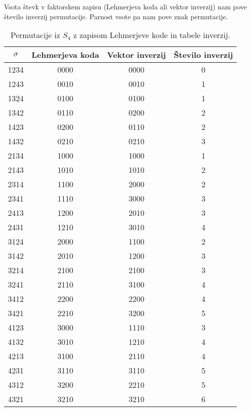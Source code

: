 \documentclass[a4paper, 12pt]{book}
\begin{document}
Vsota števk v faktorskem zapisu (Lehmerjeva koda ali vektor inverzij) nam pove število inverzij permutacije. Parnost vsote pa nam pove znak permutacije.
\begin{table}
    \begin{center}
        \begin{tabular}{ |c|c|c|c| } 
        \hline
            $\sigma$ & Lehmerjeva koda & Vektor inverzij & Število inverzij \\ 
        \hline
            1234 & 0000 & 0000 & 0 \\ 
        \hline
            1243 & 0010 & 0010 & 1 \\ 
        \hline
            1324 & 0100 & 0100 & 1 \\ 
        \hline
            1342 & 0110 & 0200 & 2 \\ 
        \hline
            1423 & 0200 & 0110 & 2 \\ 
        \hline
            1432 & 0210 & 0210 & 3 \\ 
        \hline
            2134 & 1000 & 1000 & 1 \\ 
        \hline
            2143 & 1010 & 1010 & 2 \\ 
        \hline
            2314 & 1100 & 2000 & 2 \\ 
        \hline
            2341 & 1110 & 3000 & 3 \\ 
        \hline
            2413 & 1200 & 2010 & 3 \\ 
        \hline
            2431 & 1210 & 3010 & 4 \\ 
        \hline
            3124 & 2000 & 1100 & 2 \\ 
        \hline
            3142 & 2010 & 1200 & 3 \\ 
        \hline
            3214 & 2100 & 2100 & 3 \\ 
        \hline
            3241 & 2110 & 3100 & 4 \\ 
        \hline
            3412 & 2200 & 2200 & 4 \\ 
        \hline
            3421 & 2210 & 3200 & 5 \\ 
        \hline
            4123 & 3000 & 1110 & 3 \\ 
        \hline
            4132 & 3010 & 1210 & 4 \\ 
        \hline
            4213 & 3100 & 2110 & 4 \\ 
        \hline
            4231 & 3110 & 3110 & 5 \\
        \hline
            4312 & 3200 & 2210 & 5 \\ 
        \hline
            4321 & 3210 & 3210 & 6 \\ 
        \hline
        \end{tabular}
    \end{center}
    \caption{ Permutacije iz $S_4$ z zapisom Lehmerjeve kode in tabele inverzij. }
    \label{tbl:permutacije4vektorji}
\end{table}
\end{document}
